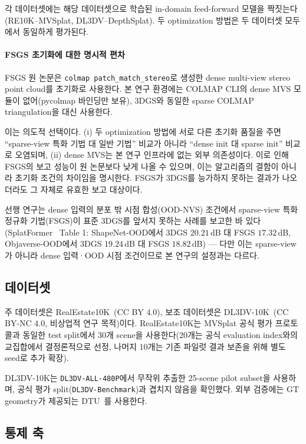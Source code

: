 각 데이터셋에는 해당 데이터셋으로 학습된 in-domain feed-forward 모델을 짝짓는다(RE10K--MVSplat, DL3DV--DepthSplat). 두 optimization 방법은 두 데이터셋 모두에서 동일하게 평가된다.

\paragraph{FSGS 초기화에 대한 명시적 편차} FSGS 원 논문은 \texttt{colmap patch\_match\_stereo}로 생성한 dense multi-view stereo point cloud를 초기화로 사용한다. 본 연구 환경에는 COLMAP CLI의 dense MVS 모듈이 없어(pycolmap 바인딩만 보유), 3DGS와 동일한 sparse COLMAP triangulation을 대신 사용한다.

이는 의도적 선택이다. (i) 두 optimization 방법에 서로 다른 초기화 품질을 주면 ``sparse-view 특화 기법 대 일반 기법'' 비교가 아니라 ``dense init 대 sparse init'' 비교로 오염되며, (ii) dense MVS는 본 연구 인프라에 없는 외부 의존성이다. 이로 인해 FSGS의 보고 성능이 원 논문보다 낮게 나올 수 있으며, 이는 알고리즘의 결함이 아니라 초기화 조건의 차이임을 명시한다. FSGS가 3DGS를 능가하지 못하는 결과가 나오더라도 그 자체로 유효한 보고 대상이다.

선행 연구는 dense 입력의 분포 밖 시점 합성(OOD-NVS) 조건에서 sparse-view 특화 정규화 기법(FSGS)이 표준 3DGS를 앞서지 못하는 사례를 보고한 바 있다(SplatFormer~\cite{chen2025splatformer} Table 1: ShapeNet-OOD에서 3DGS $20.21\,$dB 대 FSGS $17.32\,$dB, Objaverse-OOD에서 3DGS $19.24\,$dB 대 FSGS $18.82\,$dB) — 다만 이는 sparse-view가 아니라 dense 입력·OOD 시점 조건이므로 본 연구의 설정과는 다르다.

\subsection{데이터셋}

주 데이터셋은 RealEstate10K~\cite{zhou2018stereo}(CC BY 4.0), 보조 데이터셋은 DL3DV-10K~\cite{ling2024dl3dv}(CC BY-NC 4.0, 비상업적 연구 목적)이다. RealEstate10K는 MVSplat 공식 평가 프로토콜과 동일한 test split에서 30개 scene을 사용한다(20개는 공식 evaluation index와의 교집합에서 결정론적으로 선정, 나머지 10개는 기존 파일럿 결과 보존을 위해 별도 seed로 추가 확장).

DL3DV-10K는 \texttt{DL3DV-ALL-480P}에서 무작위 추출한 25-scene pilot subset을 사용하며, 공식 평가 split(\texttt{DL3DV-Benchmark})과 겹치지 않음을 확인했다. 외부 검증에는 GT geometry가 제공되는 DTU~\cite{jensen2014dtu}를 사용한다.

\subsection{통제 축}

